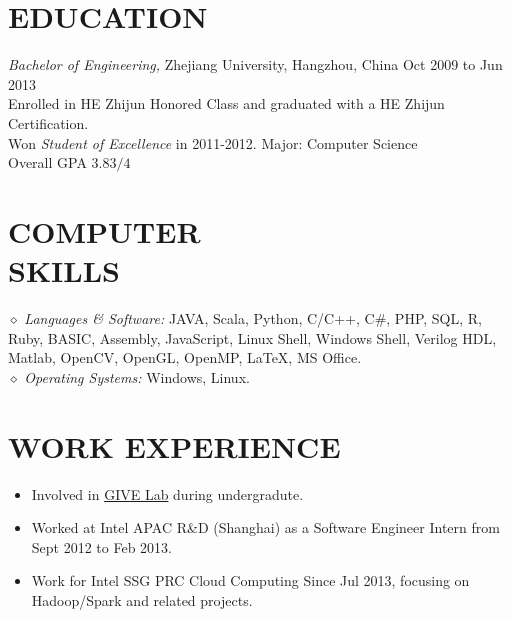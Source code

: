\documentclass[line,margin]{res}
\begin{document}
\address{Cellphone:\sl +86-152-1686-1267}
\address{E-mail:\sl me at daoyuan.wang}


\begin{resume}


\section{EDUCATION} {\sl Bachelor of Engineering,} Zhejiang University, Hangzhou, China \hfill Oct 2009 to Jun 2013\\
                Enrolled in HE Zhijun Honored Class and graduated with a HE Zhijun Certification.\\
                Won {\sl Student of Excellence} in 2011-2012.
                Major: Computer Science \\
                Overall GPA $3.83/4$

\section{COMPUTER \\ SKILLS} {$\diamond$ \sl Languages \& Software:} JAVA, Scala, Python, C/C++, C\#, PHP, SQL, R, Ruby, BASIC, Assembly, JavaScript, Linux Shell, Windows Shell, Verilog HDL, Matlab, OpenCV, OpenGL, OpenMP, \LaTeX, MS Office. \\
                {$\diamond$ \sl Operating Systems:} Windows, Linux.
                
\section{WORK EXPERIENCE}
            \begin{itemize}
            \item Involved in \href{http://give.zju.edu.cn/en/portal/index.html}{GIVE Lab} during undergradute.
            \item Worked at Intel APAC R\&D (Shanghai) as a Software Engineer Intern from Sept 2012 to Feb 2013.
            \item Work for Intel SSG PRC Cloud Computing Since Jul 2013, focusing on Hadoop/Spark and related projects.
            \end{itemize}


\end{resume}
\end{document}

